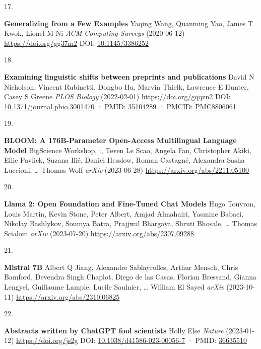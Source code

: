 \documentclass[
]{article}
\newlength{\cslhangindent}
\newlength{\csllabelwidth}
\newlength{\cslentryspacingunit} %
\newenvironment{CSLReferences}[2] %
 {%
  \setlength{\parindent}{0pt}
  \ifodd #1
  \let\oldpar\par
  \def\par{\hangindent=\cslhangindent\oldpar}
  \fi
  \setlength{\parskip}{#2\cslentryspacingunit}
 }%
 {}
\newcommand{\CSLBlock}[1]{#1\hfill\break}
\newcommand{\CSLLeftMargin}[1]{\parbox[t]{\csllabelwidth}{#1}}
\newcommand{\CSLRightInline}[1]{\parbox[t]{\linewidth - \csllabelwidth}{#1}\break}
\begin{document}
\begin{CSLReferences}{0}{0}
\leavevmode{}%
\CSLLeftMargin{17. }%
\CSLRightInline{\textbf{Generalizing from a Few Examples}
\CSLBlock{Yaqing Wang, Quanming Yao, James T Kwok, Lionel M Ni} \emph{ACM Computing Surveys} (2020-06-12) \url{https://doi.org/gg37m2}
\CSLBlock{DOI: \href{https://doi.org/10.1145/3386252}{10.1145/3386252}}}

\leavevmode{}%
\CSLLeftMargin{18. }%
\CSLRightInline{\textbf{Examining linguistic shifts between preprints and publications}
\CSLBlock{David N Nicholson, Vincent Rubinetti, Dongbo Hu, Marvin Thielk, Lawrence E Hunter, Casey S Greene} \emph{PLOS Biology} (2022-02-01) \url{https://doi.org/gqqzn2}
\CSLBlock{DOI: \href{https://doi.org/10.1371/journal.pbio.3001470}{10.1371/journal.pbio.3001470} · PMID: \href{https://www.ncbi.nlm.nih.gov/pubmed/35104289}{35104289} · PMCID: \href{https://www.ncbi.nlm.nih.gov/pmc/articles/PMC8806061}{PMC8806061}}}

\leavevmode{}%
\CSLLeftMargin{19. }%
\CSLRightInline{\textbf{BLOOM: A 176B-Parameter Open-Access Multilingual Language Model}
\CSLBlock{BigScience Workshop, :, Teven Le Scao, Angela Fan, Christopher Akiki, Ellie Pavlick, Suzana Ilić, Daniel Hesslow, Roman Castagné, Alexandra Sasha Luccioni, \ldots{} Thomas Wolf} \emph{arXiv} (2023-06-28) \url{https://arxiv.org/abs/2211.05100}}

\leavevmode{}%
\CSLLeftMargin{20. }%
\CSLRightInline{\textbf{Llama 2: Open Foundation and Fine-Tuned Chat Models}
\CSLBlock{Hugo Touvron, Louis Martin, Kevin Stone, Peter Albert, Amjad Almahairi, Yasmine Babaei, Nikolay Bashlykov, Soumya Batra, Prajjwal Bhargava, Shruti Bhosale, \ldots{} Thomas Scialom} \emph{arXiv} (2023-07-20) \url{https://arxiv.org/abs/2307.09288}}

\leavevmode{}%
\CSLLeftMargin{21. }%
\CSLRightInline{\textbf{Mistral 7B}
\CSLBlock{Albert Q Jiang, Alexandre Sablayrolles, Arthur Mensch, Chris Bamford, Devendra Singh Chaplot, Diego de las Casas, Florian Bressand, Gianna Lengyel, Guillaume Lample, Lucile Saulnier, \ldots{} William El Sayed} \emph{arXiv} (2023-10-11) \url{https://arxiv.org/abs/2310.06825}}

\leavevmode{}%
\CSLLeftMargin{22. }%
\CSLRightInline{\textbf{Abstracts written by ChatGPT fool scientists}
\CSLBlock{Holly Else} \emph{Nature} (2023-01-12) \url{https://doi.org/js2g}
\CSLBlock{DOI: \href{https://doi.org/10.1038/d41586-023-00056-7}{10.1038/d41586-023-00056-7} · PMID: \href{https://www.ncbi.nlm.nih.gov/pubmed/36635510}{36635510}}}


\end{CSLReferences}
\end{document}
